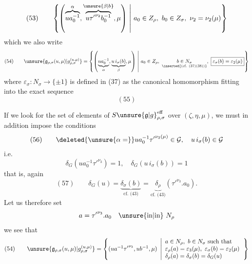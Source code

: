 
\[
(53)\qquad
\left\{\left(
\overbrace{ua_0^{-1}}^{\alpha},
\overbrace{u{\tau'}^{\nu_2}b_0^{-1}}^{\unsure{\beta|b}},
\mu\right)
\ \middle|\ a_0\in Z_\rho,\ b_0\in Z_\sigma,\
\nu_2=\nu_2(\mu)\right\}
\]
\inserted{\[
\bigl(=(ua_0^{-1},ub^{-1},\mu)\unsure{\}}
\quad\text{where}\quad b=b_0{\tau'}^{\unsure{\nu_2}}
\]}
which we also write
\[
(54)\qquad
\unsure{\mathfrak{g}_{\rho,\sigma}(u,\mu)|g_{\rho,\sigma}^{(u,\mu)}}
=
\left\{\left(
\underbrace{ua_0^{-1}}_{\alpha},
\underbrace{u\,i_\sigma(b)}_{\beta},
\mu\right)
\ \middle|\ 
a_0\in Z_\rho,\ 
\underset{\inserted{\text{(cf. (37)(38))}}}{b\in N_\sigma},\
\boxed{\varepsilon_\sigma(b)=\varepsilon_2(\mu)}
\right\}
\]
where \(\varepsilon_\sigma:N_\sigma\longrightarrow\{\pm1\}\)
is defined in (37) as the canonical homomorphism
fitting into the exact sequence
\[
(55)
\]
\diagram{\begin{tikzcd}[ampersand replacement=\&]
1\arrow[r]\&Z_\sigma\arrow[r]\&N_\sigma
\arrow[r,"\varepsilon_\sigma"]\&
\underbrace{\{\pm1\}}_{\simeq\{1,\tau'\}}\arrow[r]\&1.
\end{tikzcd}}

If we look for the set of elements of
\(S\unsure{\mathfrak{g}|g}_{\rho,\sigma}^{\mathrm{eff}}\)
over \((\zeta,\eta,\mu)\), we must in addition
impose the conditions
\[
(56)\qquad
\deleted{\unsure{\alpha=}}ua_0^{-1}{\tau'}^{\nu_3(\mu)}\in\mathcal{G},
\quad u\,i_\sigma(b)\in\mathcal{G}
\]
i.e.
\[
\delta_G(ua_0^{-1}{\tau'}^{\nu_3})=1,\quad
\delta_G(u\,i_\sigma(b))=1
\]
that is, again
\[
(57)\qquad
\delta_G(u)=
\underbrace{\delta_\sigma(b)}_{\text{cf. (43)}}
=
\underbrace{\delta_\rho}_{\text{cf. (43)}}
({\tau'}^{\nu_3}.a_0).
\]
Let us therefore set
\[
a={\tau'}^{\nu_3}.a_0\quad\text{\unsure{in|in}}\ N_\rho
\]
we see that
\[
(54)\qquad
\unsure{\mathfrak{g}_{\rho,\sigma}(u,\mu)|g_{\rho,\sigma}^{(u,\mu)}}
=
\left\{(ua^{-1}{\tau'}^{\nu_3},ub^{-1},\mu)\ \left|
\begin{array}{l}
a\in N_\rho,\ b\in N_\sigma\ \text{such that}\\
\varepsilon_\rho(a)=\varepsilon_3(\mu),\
\varepsilon_\sigma(b)=\varepsilon_2(\mu)\\
\delta_\rho(a)=\delta_\sigma(b)=\delta_G(u)
\end{array}\right.\right\}
\]

